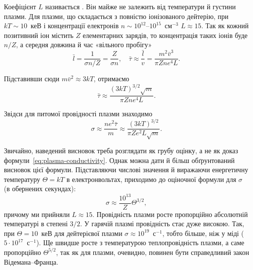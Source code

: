 Коефіцієнт $L$ називається . Він майже не залежить від температури й густини плазми. Для плазми, що складається з повністю іонізованого дейтерію, при $kT \sim 10$~кеВ і концентрації електронів $n \sim 10^{12}$--$10^{15}$~см$^{-3}$ $L \approx 15$. Так як кожний позитивний іон містить $Z$ елементарних зарядів, то концентрація таких іонів буде $n/Z$, а середня довжина й час «вільного пробігу»
\begin{equation*}
	\bar{l} = \frac{1}{\sigma n/Z} = \frac{Z}{\sigma n}, \quad \bar{\tau} \approx \frac{\bar{l}}{v} = \frac{m^2\bar{v}^3}{\pi Z n e^4 L}.
\end{equation*}

Підставивши сюди $m\bar{v}^2 \approx 3kT$, отримаємо
\begin{equation}\label{eq:relaxation-time}
	\bar{\tau} \approx \frac{(3kT)^{3/2}\sqrt{m}}{\pi Z n e^4 L}.
\end{equation}

Звідси для питомої провідності плазми знаходимо
\begin{equation}\label{eq:plasma-conductivity}
	\sigma \approx \frac{ne^2\bar{\tau}}{m} \approx \frac{(3kT)^{3/2}}{\pi Z e^2 L\sqrt{m}}.
\end{equation}

Звичайно, наведений висновок треба розглядати як грубу оцінку, а не як доказ формули~\eqref{eq:plasma-conductivity}. Однак можна дати й більш обґрунтований висновок цієї формули. Підставляючи числові значення й виражаючи енергетичну температуру $\Theta = kT$ в електронвольтах, приходимо до оціночної формули для $\sigma$ (в обернених секундах):
\begin{equation*}
	\sigma \approx \frac{10^{13}}{Z}\Theta^{3/2},
\end{equation*}
причому ми прийняли $L \approx 15$. Провідність плазми росте пропорційно абсолютній температурі в степені $3/2$. У гарячій плазмі провідність стає дуже високою. Так, при $\Theta = 10$~кеВ для дейтерієвої плазми $\sigma \approx 10^{19}$~с$^{-1}$, тобто більше, ніж у міді ($5\cdot10^{17}$~с$^{-1}$). Ще швидше росте з температурою теплопровідність плазми, а саме пропорційно $\Theta^{5/2}$, так як для плазми, очевидно, повинен бути справедливий закон Відемана--Франца.

